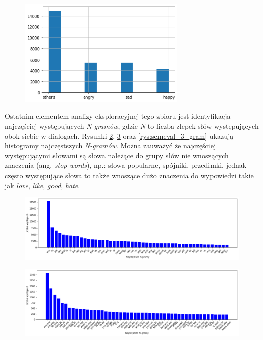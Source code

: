 \begin{figure}[t]
\centering\includegraphics[width=8cm]{figures/rozklad_liczby_klas_semeval.png}
\label{rys:rozklad_liczby_klas_semeval}
\end{figure}

Ostatnim elementem analizy eksploracyjnej tego zbioru jest identyfikacja najczęściej występujących \textit{N-gramów}, gdzie \textit{N} to liczba zlepek słów występujących obok siebie w dialogach. Rysunki \ref{rys:semeval_1_gram}, \ref{rys:semeval_2_gramy} oraz \ref{rys:semeval_3_gram} ukazują histogramy najczęstszych \textit{N-gramów}. Można zauważyć że najczęściej występującymi słowami są słowa należące do grupy słów nie wnoszących znaczenia (ang. \textit{stop words}), np.: słowa popularne, spójniki, przedimki, jednak często występujące słowa to także wnoszące dużo znaczenia do wypowiedzi takie jak \textit{love}, \textit{like}, \textit{good}, \textit{hate}.

\begin{figure}[t]
\centering\includegraphics[width=\textwidth]{figures/semeval_1_gram.png}
\label{rys:semeval_1_gram}
\end{figure}

\begin{figure}[t]
\centering\includegraphics[width=\textwidth]{figures/semeval_2_gramy.png}
\label{rys:semeval_2_gramy}
\end{figure}

